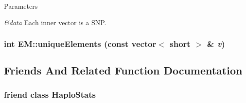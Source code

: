 \begin{DoxyParams}{Parameters}
\item[{\em \&data}]Each inner vector is a SNP. \end{DoxyParams}
\hypertarget{classEM_a5393a49dd932245a931e6d5eece1cf27}{
\subsubsection[{uniqueElements}]{\setlength{\rightskip}{0pt plus 5cm}int EM::uniqueElements (const vector$<$ short $>$ \& {\em v})}}
\label{classEM_a5393a49dd932245a931e6d5eece1cf27}


\subsection{Friends And Related Function Documentation}
\hypertarget{classEM_ab5eb8e85b324a9728c593bdc1ada8198}{
\subsubsection[{HaploStats}]{\setlength{\rightskip}{0pt plus 5cm}friend class {\bf HaploStats}}}
\label{classEM_ab5eb8e85b324a9728c593bdc1ada8198}



